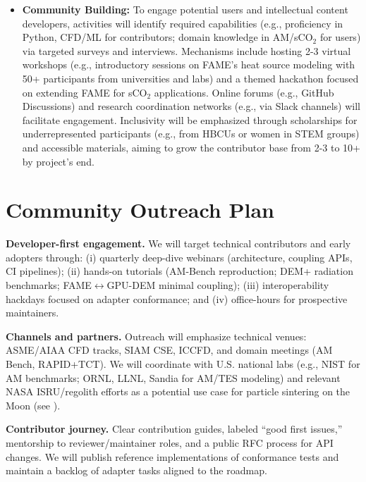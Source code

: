 \documentclass[11pt]{article}
\begin{document}
\begin{itemize}
    \item \textbf{Community Building:} To engage potential users and intellectual content developers, activities will identify required capabilities (e.g., proficiency in Python, CFD/ML for contributors; domain knowledge in AM/sCO$_2$ for users) via targeted surveys and interviews. Mechanisms include hosting 2-3 virtual workshops (e.g., introductory sessions on FAME's heat source modeling with 50+ participants from universities and labs) and a themed hackathon focused on extending FAME for sCO$_2$ applications. Online forums (e.g., GitHub Discussions) and research coordination networks (e.g., via Slack channels) will facilitate engagement. Inclusivity will be emphasized through scholarships for underrepresented participants (e.g., from HBCUs or women in STEM groups) and accessible materials, aiming to grow the contributor base from 2-3 to 10+ by project's end.
\end{itemize}

\section*{Community Outreach Plan}
\vspace{-3pt}
\noindent
\textbf{Developer-first engagement.} We will target technical contributors and early adopters through: (i) quarterly deep-dive webinars (architecture, coupling APIs, CI pipelines); (ii) hands-on tutorials (AM-Bench reproduction; DEM+ radiation benchmarks; FAME$\leftrightarrow$GPU-DEM minimal coupling); (iii) interoperability hackdays focused on adapter conformance; and (iv) office-hours for prospective maintainers.\vspace{4pt}

\noindent
\textbf{Channels and partners.} Outreach will emphasize technical venues: ASME/AIAA CFD tracks, SIAM CSE, ICCFD, and domain meetings (AM Bench, RAPID+TCT). We will coordinate with U.S. national labs (e.g., NIST for AM benchmarks; ORNL, LLNL, Sandia for AM/TES modeling) and relevant NASA ISRU/regolith efforts as a potential use case for particle sintering on the Moon (see \cite{muellerAdditiveConstructionUsing2014, ConstructionTechnologyMoon2025}).\vspace{4pt}

\noindent
\textbf{Contributor journey.} Clear contribution guides, labeled ``good first issues,'' mentorship to reviewer/maintainer roles, and a public RFC process for API changes. We will publish reference implementations of conformance tests and maintain a backlog of adapter tasks aligned to the roadmap.\vspace{4pt}
\end{document}
